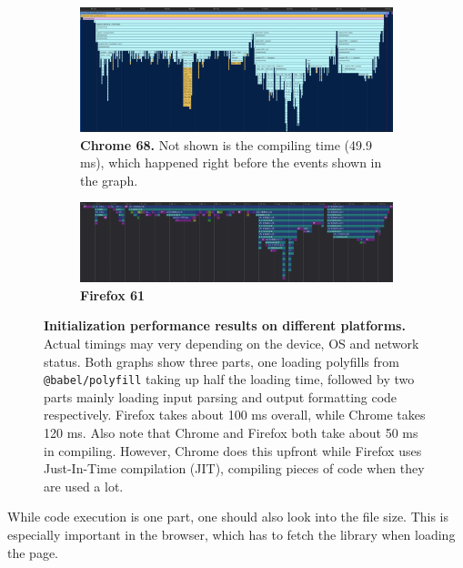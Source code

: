 \documentclass[fleqn,10pt,lineno]{wlpeerj} %
\begin{document}
\begin{figure}[ht]
\begin{subfigure}{\textwidth}
  \centering
  \includegraphics[width=\linewidth]{figures/perf_chrome.png}
  \caption{\textbf{Chrome 68.}
  Not shown is the compiling time (49.9 ms), which happened right before the events shown in the graph.}
  \label{fig:perf-chrome}
\end{subfigure}
\begin{subfigure}{\textwidth}
  \centering
  \includegraphics[width=\linewidth]{figures/perf_ff.png}
  \caption{\textbf{Firefox 61}}
  \label{fig:perf-ff}
\end{subfigure}
\caption{\textbf{Initialization performance results on different platforms.}
Actual timings may very depending on the device, OS and network status. Both graphs show three parts, one loading polyfills from \texttt{@babel/polyfill} taking up half the loading time, followed by two parts mainly loading input parsing and output formatting code respectively. Firefox takes about 100 ms overall, while Chrome takes 120 ms. Also note that Chrome and Firefox both take about 50 ms in compiling. However, Chrome does this upfront while Firefox uses Just-In-Time compilation (JIT), compiling pieces of code when they are used a lot.}
\label{fig:perf}
\end{figure}

While code execution is one part, one should also look into the file size. This is especially important in the browser, which has to fetch the library when loading the page.
\end{document}
